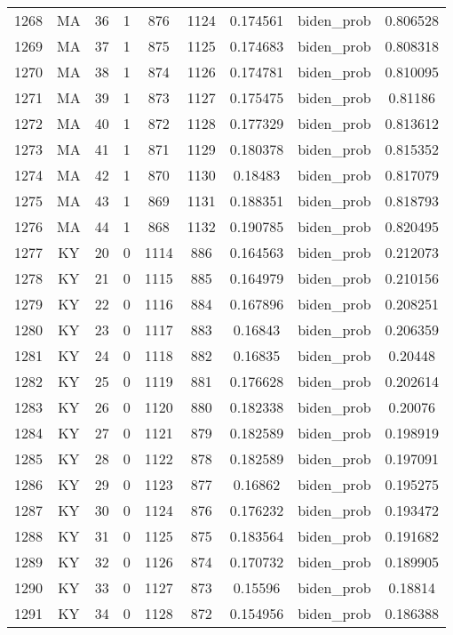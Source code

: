 \documentclass[12pt,a4paper]{article}
\begin{document}
\begin{tabular}{r|cccccccc}
	1268 & MA & 36 & 1 & 876 & 1124 & 0.174561 & biden\_prob & 0.806528 \\
	1269 & MA & 37 & 1 & 875 & 1125 & 0.174683 & biden\_prob & 0.808318 \\
	1270 & MA & 38 & 1 & 874 & 1126 & 0.174781 & biden\_prob & 0.810095 \\
	1271 & MA & 39 & 1 & 873 & 1127 & 0.175475 & biden\_prob & 0.81186 \\
	1272 & MA & 40 & 1 & 872 & 1128 & 0.177329 & biden\_prob & 0.813612 \\
	1273 & MA & 41 & 1 & 871 & 1129 & 0.180378 & biden\_prob & 0.815352 \\
	1274 & MA & 42 & 1 & 870 & 1130 & 0.18483 & biden\_prob & 0.817079 \\
	1275 & MA & 43 & 1 & 869 & 1131 & 0.188351 & biden\_prob & 0.818793 \\
	1276 & MA & 44 & 1 & 868 & 1132 & 0.190785 & biden\_prob & 0.820495 \\
	1277 & KY & 20 & 0 & 1114 & 886 & 0.164563 & biden\_prob & 0.212073 \\
	1278 & KY & 21 & 0 & 1115 & 885 & 0.164979 & biden\_prob & 0.210156 \\
	1279 & KY & 22 & 0 & 1116 & 884 & 0.167896 & biden\_prob & 0.208251 \\
	1280 & KY & 23 & 0 & 1117 & 883 & 0.16843 & biden\_prob & 0.206359 \\
	1281 & KY & 24 & 0 & 1118 & 882 & 0.16835 & biden\_prob & 0.20448 \\
	1282 & KY & 25 & 0 & 1119 & 881 & 0.176628 & biden\_prob & 0.202614 \\
	1283 & KY & 26 & 0 & 1120 & 880 & 0.182338 & biden\_prob & 0.20076 \\
	1284 & KY & 27 & 0 & 1121 & 879 & 0.182589 & biden\_prob & 0.198919 \\
	1285 & KY & 28 & 0 & 1122 & 878 & 0.182589 & biden\_prob & 0.197091 \\
	1286 & KY & 29 & 0 & 1123 & 877 & 0.16862 & biden\_prob & 0.195275 \\
	1287 & KY & 30 & 0 & 1124 & 876 & 0.176232 & biden\_prob & 0.193472 \\
	1288 & KY & 31 & 0 & 1125 & 875 & 0.183564 & biden\_prob & 0.191682 \\
	1289 & KY & 32 & 0 & 1126 & 874 & 0.170732 & biden\_prob & 0.189905 \\
	1290 & KY & 33 & 0 & 1127 & 873 & 0.15596 & biden\_prob & 0.18814 \\
	1291 & KY & 34 & 0 & 1128 & 872 & 0.154956 & biden\_prob & 0.186388 \\

\end{tabular}
\end{document}
